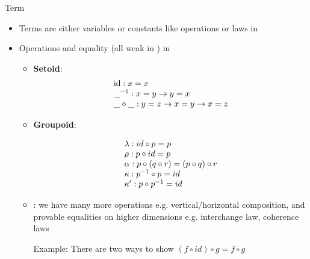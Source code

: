 \documentclass[12pt, mathserif,handout]{beamer}
\begin{document}
\begin{frame}[allowframebreaks,c]{Term}

\begin{itemize}

\item Terms are either variables or constants like operations or laws 
  in \wog

\item Operations and equality (all weak in \wog) in

\begin{itemize}

\item \textbf{Setoid}: 
\begin{equation*}
\begin{array}[b]{l} 
\text{id} : x = x \\
\_^{-1} : x= y \to y  = x \\
\_ \circ\_ : y = z \to x = y \to x = z
 \end{array}
\end{equation*}

\item \textbf{Groupoid}: 

\begin{equation*}
\begin{array}[b]{l}
\lambda : id \circ p = p \\
\rho : p \circ id = p \\
\alpha : p \circ (q \circ r) = (p \circ q) \circ r \\
\kappa : p^{-1}\circ p = id \\
\kappa' : p \circ p^{-1} = id
 \end{array}
\end{equation*}

\item \textbf{\wogs} : we have many more operations e.g. vertical/horizontal composition, and provable equalities on higher
  dimensions e.g. interchange law, coherence laws


Example: There are
   two ways to show $(f \circ id) \circ g = f \circ g$


\end{itemize}
\end{itemize}
\end{frame}
\end{document}
